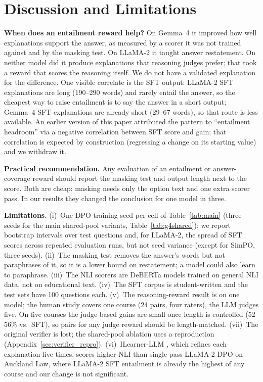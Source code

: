 \section{Discussion and Limitations}
\label{sec:discussion}

\textbf{When does an entailment reward help?} On Gemma~4 it improved how well explanations support the answer, as measured by a scorer it was not trained against and by the masking test. On LLaMA-2 it taught answer restatement. On neither model did it produce explanations that reasoning judges prefer; that took a reward that scores the reasoning itself. We do not have a validated explanation for the difference. One visible correlate is the SFT output: LLaMA-2 SFT explanations are long (190--290 words) and rarely entail the answer, so the cheapest way to raise entailment is to say the answer in a short output; Gemma~4 SFT explanations are already short (29--67 words), so that route is less available. An earlier version of this paper attributed the pattern to ``entailment headroom'' via a negative correlation between SFT score and gain; that correlation is expected by construction (regressing a change on its starting value) and we withdraw it.

\textbf{Practical recommendation.} Any evaluation of an entailment or answer-coverage reward should report the masking test and output length next to the score. Both are cheap: masking needs only the option text and one extra scorer pass. In our results they changed the conclusion for one model in three.

\textbf{Limitations.} (i)~One DPO training seed per cell of Table~\ref{tab:main} (three seeds for the main shared-pool variants, Table~\ref{tab:g4shared}); we report bootstrap intervals over test questions and, for LLaMA-2, the spread of SFT scores across repeated evaluation runs, but not seed variance (except for SimPO, three seeds). (ii)~The masking test removes the answer's words but not paraphrases of it, so it is a lower bound on restatement; a model could also learn to paraphrase. (iii)~The NLI scorers are DeBERTa models trained on general NLI data, not on educational text. (iv)~The SFT corpus is student-written and the test sets have 100 questions each. (v)~The reasoning-reward result is on one model; the human study covers one course (24 pairs, four raters), the LLM judges five. On five courses the judge-based gains are small once length is controlled (52--56\% vs.\ SFT), so pairs for any judge reward should be length-matched. (vii)~The original verifier is lost; the shared-pool ablation uses a reproduction (Appendix~\ref{sec:verifier_repro}). (vi)~ILearner-LLM \citep{bao2025exploring}, which refines each explanation five times, scores higher NLI than single-pass LLaMA-2 DPO on Auckland Law, where LLaMA-2 SFT entailment is already the highest of any course and our change is not significant.
